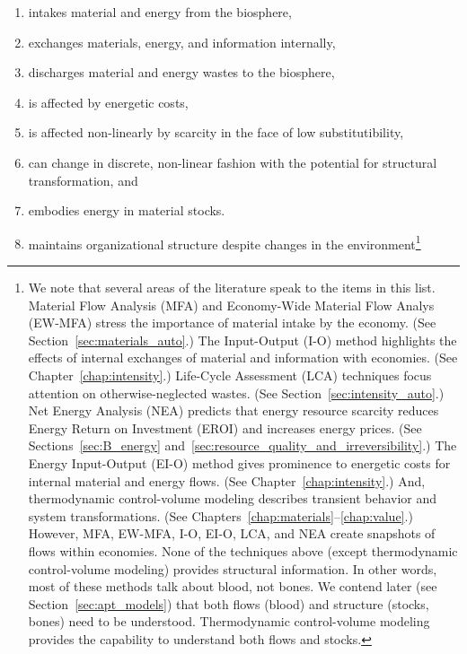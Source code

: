 \begin{enumerate}
	\item{intakes material and energy from the biosphere,}
	\item{exchanges materials, energy, and information internally,}
	\item{discharges material and energy wastes to the biosphere,}
	\item{is affected by energetic costs,}
	\item{is affected non-linearly by scarcity in the face of low substitutibility,}
	\item{can change in discrete, non-linear fashion with the potential 
			for structural transformation, and}
	\item{embodies energy in material stocks.}
	\item{maintains organizational structure despite changes in the environment\footnote{We note that 
			several areas of the literature speak to the items in this list.
			Material Flow Analysis (MFA) and 
			Economy-Wide Material Flow Analys (EW-MFA)
			stress the importance of
			material intake by the economy. 
			(See Section~\ref{sec:materials_auto}.)
			The Input-Output (I-O) method highlights the effects of internal exchanges
			of material and information with economies. 
			(See Chapter~\ref{chap:intensity}.)
			Life-Cycle Assessment (LCA) techniques focus attention 
			on otherwise-neglected wastes. 
			(See Section~\ref{sec:intensity_auto}.)
			Net Energy Analysis (NEA) predicts that energy resource 
			scarcity reduces Energy Return on Investment (EROI)
			and increases energy prices.
			(See Sections~\ref{sec:B_energy} 
			and~\ref{sec:resource_quality_and_irreversibility}.)
			The Energy Input-Output (EI-O) method gives prominence to energetic costs
			for internal material and energy flows.
			(See Chapter~\ref{chap:intensity}.)
			And, thermodynamic control-volume modeling describes
			transient behavior and system transformations.
			(See Chapters~\ref{chap:materials}--\ref{chap:value}.)
			However, MFA, EW-MFA, I-O, EI-O, LCA, and NEA create snapshots 
			of flows within economies. 
			None of the techniques above (except thermodynamic control-volume modeling) 
			provides structural information. 
			In other words, most of these methods talk about blood, not bones. 
			We contend later (see Section~\ref{sec:apt_models}) that both flows (blood) 
			and structure (stocks, bones) need to be understood.
			Thermodynamic control-volume modeling provides the capability 
			to understand both flows and stocks.}}
\end{enumerate}

